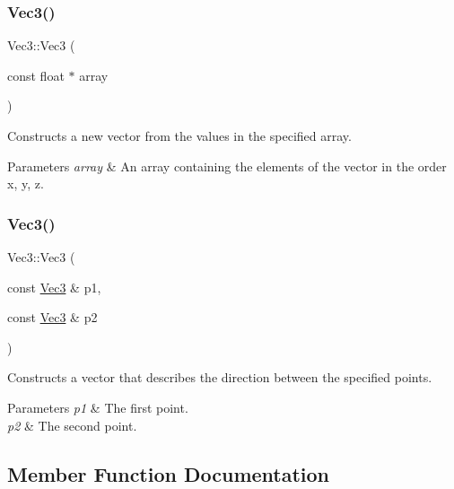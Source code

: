 \subsubsection{\texorpdfstring{Vec3()}{Vec3()}\hspace{0.1cm}{\footnotesize\ttfamily [8/9]}}
{\footnotesize\ttfamily Vec3\+::\+Vec3 (\begin{DoxyParamCaption}\item[{const float $\ast$}]{array }\end{DoxyParamCaption})}

Constructs a new vector from the values in the specified array.


\begin{DoxyParams}{Parameters}
{\em array} & An array containing the elements of the vector in the order x, y, z. \\
\hline
\end{DoxyParams}
\mbox{\label{classVec3_a565e372bc20d212a9f4724b9bb92f8d0}} 
\subsubsection{\texorpdfstring{Vec3()}{Vec3()}\hspace{0.1cm}{\footnotesize\ttfamily [9/9]}}
{\footnotesize\ttfamily Vec3\+::\+Vec3 (\begin{DoxyParamCaption}\item[{const \hyperlink{classVec3}{Vec3} \&}]{p1,  }\item[{const \hyperlink{classVec3}{Vec3} \&}]{p2 }\end{DoxyParamCaption})}

Constructs a vector that describes the direction between the specified points.


\begin{DoxyParams}{Parameters}
{\em p1} & The first point. \\
\hline
{\em p2} & The second point. \\
\hline
\end{DoxyParams}


\subsection{Member Function Documentation}
\mbox{\label{classVec3_a7d60e09ff6ab05a86025a209070c471c}} 
